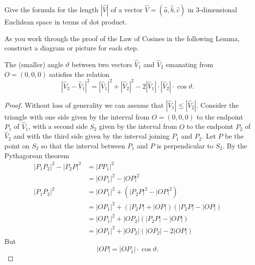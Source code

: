 \documentclass{ximera}
\begin{document}
\begin{exercise}
Give the formula for the length $\left\vert \hat{V}\right\vert $ of a vector
$\hat{V}=\left(  \hat{a},\hat{b},\hat{c}\right)  $ in 3-dimensional Euclidean
space in terms of dot product.
\end{exercise}

\begin{exercise}
As you work through the proof of the Law of Cosines in the following Lemma,
construct a diagram or picture for each step.
\end{exercise}

\begin{lemma}
\label{110} The (smaller) angle $\vartheta$ between two
vectors $\hat{V}_{1}$ and $\hat{V}_{2}$ emanating from $O=\left(
0,0,0\right)  $ satisfies the relation%
\[
\left\vert \hat{V}_{2}-\hat{V}_{1}\right\vert ^{2}=\left\vert \hat{V}%
_{1}\right\vert ^{2}+\left\vert \hat{V}_{2}\right\vert ^{2}-2\left\vert
\hat{V}_{1}\right\vert \cdot\left\vert \hat{V}_{2}\right\vert \cdot
\cos\vartheta.
\]

\end{lemma}

\begin{proof}
Without loss of generality we can assume that $\left\vert \hat{V}%
_{1}\right\vert \leq\left\vert \hat{V}_{2}\right\vert $. Consider the triangle
with one side given by the interval from $O=\left(  0,0,0\right)  $ to the
endpoint $P_{1}$ of $\hat{V}_{1}$, with a second side $S_{2}$ given by the
interval from $O$ to the endpoint $P_{2}$ of $\hat{V}_{2}$ and with the third
side given by the interval joining $P_{1}$ and $P_{2}$. Let $P$ be the point
on $S_{2}$ so that the interval between $P_{1}$ and $P$ is perpendicular to
$S_{2}$. By the Pythagorean theorem%
\begin{align*}
\left\vert P_{1}P_{2}\right\vert ^{2}-\left\vert P_{2}P\right\vert ^{2}  &
=\left\vert PP_{1}\right\vert ^{2}\\
&  =\left\vert OP_{1}\right\vert ^{2}-\left\vert OP\right\vert ^{2}\\
\left\vert P_{1}P_{2}\right\vert ^{2}  &  =\left\vert OP_{1}\right\vert
^{2}+\left(  \left\vert P_{2}P\right\vert ^{2}-\left\vert OP\right\vert
^{2}\right) \\
&  =\left\vert OP_{1}\right\vert ^{2}+\left(  \left\vert P_{2}P\right\vert
+\left\vert OP\right\vert \right)  \left(  \left\vert P_{2}P\right\vert
-\left\vert OP\right\vert \right) \\
&  =\left\vert OP_{1}\right\vert ^{2}+\left\vert OP_{2}\right\vert \left(
\left\vert P_{2}P\right\vert -\left\vert OP\right\vert \right) \\
&  =\left\vert OP_{1}\right\vert ^{2}+\left\vert OP_{2}\right\vert \left(
\left\vert OP_{2}\right\vert -2\left\vert OP\right\vert \right)
\end{align*}
But%
\[
\left\vert OP\right\vert =\left\vert OP_{1}\right\vert \cdot\cos\vartheta.
\]

\end{proof}
\end{document}
